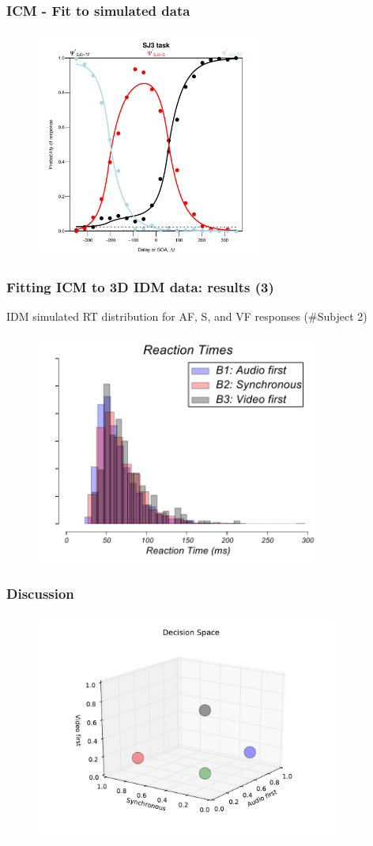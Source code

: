 \documentclass[xcolor={fixpdftex,hyperref,x11names},10pt,pdftex,hyperref={pdftex}]{beamer}
\begin{document}
\begin{frame}
  \frametitle{ICM - Fit to simulated data}
   \begin{figure}[h]
      \includegraphics[width=75mm]{figs/sub2_fitted_model.pdf}
   \end{figure}
\end{frame}


\begin{frame}
  \frametitle{Fitting ICM to 3D IDM data: results (3)}
  IDM simulated RT distribution for AF, S, and VF responses (\#Subject 2)
   \begin{figure}[h]
    \includegraphics[width=95mm]{figs/sub2_reaction_times2.pdf}
    \end{figure}
\end{frame}


\begin{frame}
  \frametitle{Discussion}
  \begin{figure}[h]
      \includegraphics[width=100mm]{figs/decision_space_3d.pdf}
  \end{figure}
\end{frame}
\end{document}
